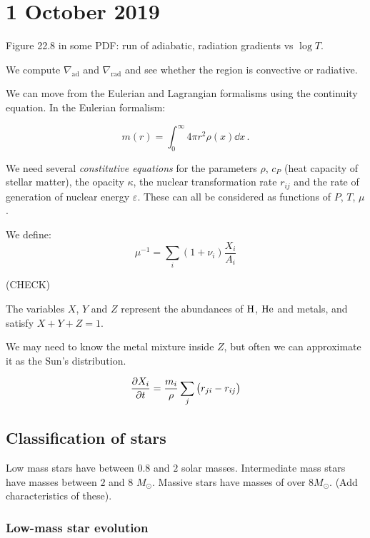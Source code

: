 \documentclass[main.tex]{subfiles}
\begin{document}
\section*{1 October 2019}

Figure 22.8 in some PDF: run of adiabatic, radiation gradients vs \(\log T \).

We compute \(\nabla_{\text{ad}}\) and \(\nabla_{\text{rad}}\) and see whether the region is convective or radiative.

We can move from the Eulerian and Lagrangian formalisms using the continuity equation. In the Eulerian formalism:

\begin{equation}
  m(r) = \int_0^\infty 4 \pi r^2 \rho(x) \dd{x} \,.
\end{equation}

We need several \emph{constitutive equations} for the parameters \(\rho\), \(c_P\) (heat capacity of stellar matter), the opacity \(\kappa\), the nuclear transformation rate \(r_{ij}\) and the rate of generation of nuclear energy \(\varepsilon\). These can all be considered as functions of \(P\), \(T\), \(\mu\).

We define:
%
\begin{equation}
  \mu^{-1} = \sum _{i}  (1 + \nu_i) \frac{X_i}{A_i}
\end{equation}

(CHECK)

The variables \(X\), \(Y\) and \(Z\) represent the abundances of \(\ce{H}\), \(\ce{He}\) and metals, and satisfy \(X+Y+Z=1\).

We may need to know the metal mixture inside \(Z\), but often we can approximate it as the Sun's distribution.

\begin{equation}
  \pdv{X_i}{t} = \frac{m_i}{\rho} \sum _j \qty( r_{ji} - r_{ij})
\end{equation}

\subsection{Classification of stars}

Low mass stars have between \(0.8\) and \(2\) solar masses.
Intermediate mass stars have masses between \(2\) and \(8\) \(M_{\odot}\).
Massive stars have masses of over \(8 M_{\odot}\).
(Add characteristics of these).

\subsubsection{Low-mass star evolution}
\end{document}
